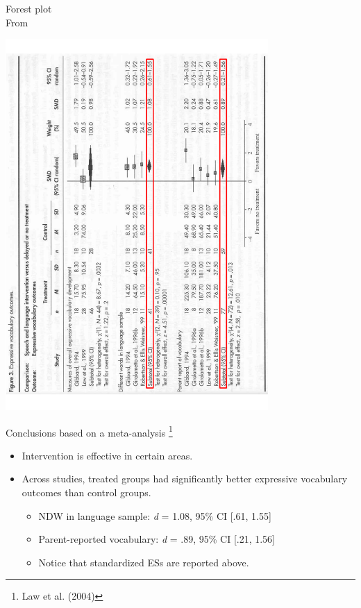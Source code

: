 \documentclass{beamer}
\begin{document}
% 
\begin{frame}{Forest plot  \\ \scriptsize{From \citet[p. 3]{Law2004a}}}
\begin{center}
\includegraphics[angle=270, origin=c, width=10cm]{images/law_fig3b.pdf}
\end{center}
\end{frame}

% 
\begin{frame}{Conclusions based on a meta-analysis \footnote{\tiny{Law et al. (2004)}}}
	\begin{itemize}
	\item Intervention is effective in certain areas.
	\item Across studies, treated groups had significantly better expressive vocabulary outcomes than control groups.
		\begin{itemize}
		\item NDW in language sample: \emph{d} = 1.08, 95\% CI [.61, 1.55]
		\item Parent-reported vocabulary: \emph{d} = .89, 95\% CI [.21, 1.56]
		\item Notice that \alert{standardized ESs} are reported above.
		\end{itemize}
	\end{itemize}
\end{frame}
\end{document}
